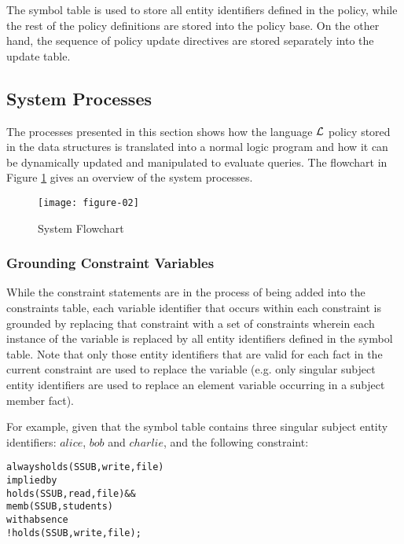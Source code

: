 \documentclass[global,twocolumn,draft]{svjour}
\newenvironment{vverbatim}
  {\begin{alltt}}
  {\vspace{-\baselineskip}\end{alltt}}
\begin{document}
        The symbol table is used to store all entity identifiers defined in the
        policy, while the rest of the policy definitions are stored into the
        policy base. On the other hand, the sequence of policy update
        directives are stored separately into the update table.

    \subsection{System Processes}

      The processes presented in this section shows how the language
      ${\cal L}$ policy stored in the data structures is translated into a
      normal logic program and how it can be dynamically updated and
      manipulated to evaluate queries. The flowchart in Figure \ref{fig-2}
      gives an overview of the system processes.

      \begin{figure}[ht]
        \begin{center}
          \texttt{[image: figure-02]}
          \caption{System Flowchart}
          \label{fig-2}
        \end{center}
      \end{figure}

      \subsubsection{Grounding Constraint Variables}

        While the constraint statements are in the process of being added into
        the constraints table, each variable identifier that occurs within each
        constraint is grounded by replacing that constraint with a set of
        constraints wherein each instance of the variable is replaced by all
        entity identifiers defined in the symbol table. Note that only those
        entity identifiers that are valid for each fact in the current
        constraint are used to replace the variable (e.g. only singular
        subject entity identifiers are used to replace an element variable
        occurring in a subject member fact).

        For example, given that the symbol table contains three singular
        subject entity identifiers: $alice$, $bob$ and $charlie$, and the
        following constraint:
        
        \begin{vverbatim}
  always holds(SSUB, write, file)
    implied by
      holds(SSUB, read, file) &&
      memb(SSUB, students)
    with absence
      !holds(SSUB, write, file);
        \end{vverbatim}
\end{document}
